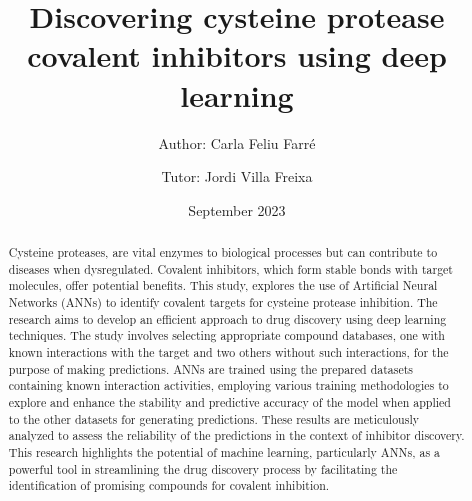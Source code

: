 \documentclass[final,times,twocolumn,article]{elsarticle}
\begin{document}
\begin{frontmatter}



\title{Discovering cysteine protease covalent inhibitors using deep learning}


\author{Author: Carla Feliu Farré}
\author{Tutor: Jordi Villa Freixa}
\date{September 2023}

\begin{abstract}
Cysteine proteases, are vital enzymes to biological processes but can contribute to diseases when dysregulated. Covalent inhibitors, which form stable bonds with target molecules, offer potential benefits. This study, explores the use of Artificial Neural Networks (ANNs) to identify covalent targets for cysteine protease inhibition. The research aims to develop an efficient approach to drug discovery using deep learning techniques. 
The study involves selecting appropriate compound databases, one with known interactions with the target and two others without such interactions, for the purpose of making predictions. ANNs are trained using the prepared datasets containing known interaction activities, employing various training methodologies to explore and enhance the stability and predictive accuracy of the model when applied to the other datasets for generating predictions. These results are meticulously analyzed to assess the reliability of the predictions in the context of inhibitor discovery. 
This research highlights the potential of machine learning, particularly ANNs, as a powerful tool in streamlining the drug discovery process by facilitating the identification of promising compounds for covalent inhibition.



\end{abstract}
\end{frontmatter}
\end{document}
